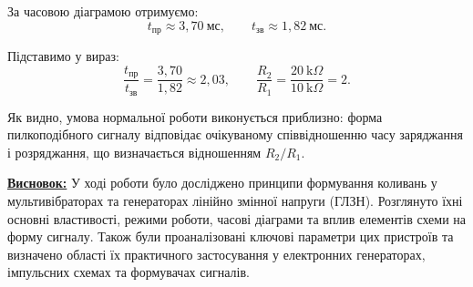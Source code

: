 \documentclass[12pt,a4paper]{article}
\begin{document}
За часовою діаграмою отримуємо:
\[
t_{\text{пр}} \approx 3{,}70\ \text{мс}, \qquad
t_{\text{зв}} \approx 1{,}82\ \text{мс}.
\]

Підставимо у вираз:
\[
\frac{t_{\text{пр}}}{t_{\text{зв}}}
= \frac{3{,}70}{1{,}82} \approx 2{,}03,
\qquad
\frac{R_2}{R_1}
= \frac{20~\text{k}\Omega}{10~\text{k}\Omega} = 2.
\]

Як видно, умова нормальної роботи виконується приблизно: форма 
пилкоподібного сигналу відповідає очікуваному співвідношенню часу 
заряджання і розряджання, що визначається відношенням $R_2/R_1$.

    \vspace{1em}

    \noindent
    \textbf{\underline{Висновок:}} У ході роботи було досліджено принципи формування коливань у мультивібраторах та генераторах лінійно змінної напруги (ГЛЗН).
    Розглянуто їхні основні властивості, режими роботи, часові діаграми та вплив елементів схеми на форму сигналу. Також були проаналізовані ключові параметри цих пристроїв та визначено області їх практичного застосування у електронних генераторах, імпульсних схемах та формувачах сигналів.
\end{document}
